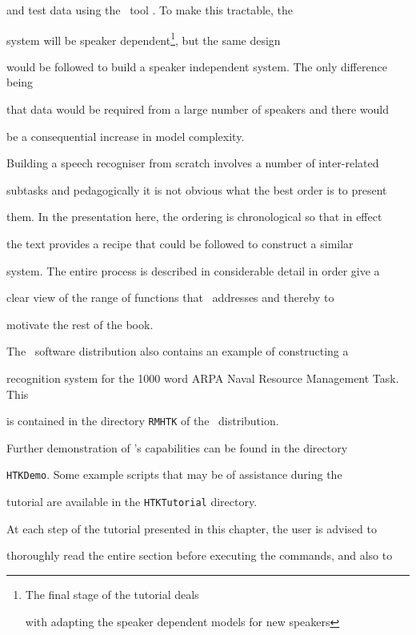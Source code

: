 and test data using the \HTK\ tool .  To make this tractable, the


system will be speaker dependent\footnote{The final stage of the tutorial deals 


with adapting the speaker dependent models for new speakers}, but the same design 


would be followed to build a speaker independent system.  The only difference being 


that data would be required from a large number of speakers and there would 


be a consequential increase in model complexity. 





Building a speech recogniser from scratch involves a number of inter-related


subtasks and pedagogically it is not obvious what the best order is to present


them. In the presentation here, the ordering is chronological so that in effect


the text provides a recipe that could be followed to construct a similar


system.  The entire process is described in considerable detail in order give a


clear view of the range of functions that \HTK\ addresses and thereby to


motivate the rest of the book.





The \HTK\ software distribution also contains an example of constructing a


recognition system for the 1000 word ARPA Naval Resource Management Task. This


is contained in the directory \texttt{RMHTK} of the \HTK\ distribution.


Further demonstration of \HTK's capabilities can be found in the directory 


\texttt{HTKDemo}. Some example scripts that may be of assistance during the 


tutorial are available in the \texttt{HTKTutorial} directory.





At each step of the tutorial presented in this chapter, the user is advised to


thoroughly read the entire section before executing the commands, and also to


